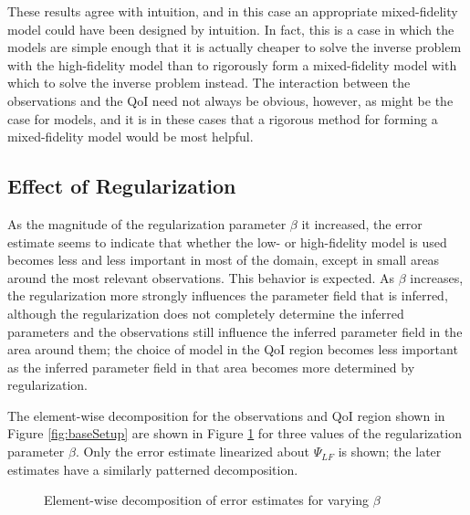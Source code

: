 These results agree with intuition, and in this case an appropriate mixed-fidelity model could have been designed by intuition. In fact, this is a case in which the models are simple enough that it is actually cheaper to solve the inverse problem with the high-fidelity model than to rigorously form a mixed-fidelity model with which to solve the inverse problem instead. The interaction between the observations and the QoI need not always be obvious, however, as might be the case for  models, and it is in these cases that a rigorous method for forming a mixed-fidelity model would be most helpful.

\subsection{Effect of Regularization}

As the magnitude of the regularization parameter $\beta$ it increased, the error estimate seems to indicate that whether the low- or high-fidelity model is used becomes less and less important in most of the domain, except in small areas around the most relevant observations. This behavior is expected. As $\beta$ increases, the regularization more strongly influences the parameter field that is inferred, although the regularization does not completely determine the inferred parameters and the observations still influence the inferred parameter field in the area around them; the choice of model in the QoI region becomes less important as the inferred parameter field in that area becomes more determined by regularization. 

The element-wise decomposition for the observations and QoI region shown in Figure \ref{fig:baseSetup} are shown in Figure \ref{fig:regStudy} for three values of the regularization parameter $\beta$. Only the error estimate linearized about $\Psi_{LF}$ is shown; the later estimates have a similarly patterned decomposition.

\begin{figure}
\centering
{}
\caption{Element-wise decomposition of error estimates for varying $\beta$ }
\label{fig:regStudy}
\end{figure}


